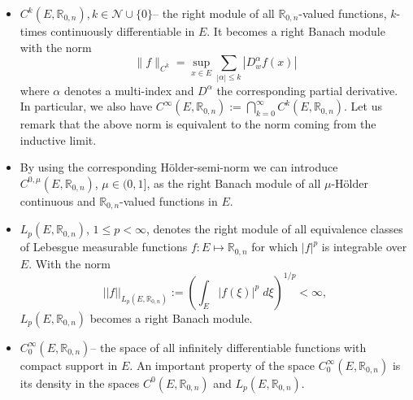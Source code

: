 \documentclass[12pt]{amsart}
\theoremstyle{definition}
\newcommand{\R}{\mathbb{R}}
\newcommand{\Cl}{\R_{0,n}}
\begin{document}
\begin{itemize}
	\item $C^k(E,\Cl), k\in\mathcal{N}\cup\{0\}$-- the right module of all $\Cl$-valued functions, $k$-times continuously differentiable in $E$. It becomes a right Banach module with the norm
	$$
	\|f\|_{C^k}=\sup_{x\in E}\sum_{|\alpha|\leq k}|D^\alpha_w f(x)|
	$$
where $\alpha$ denotes a multi-index and $D^\alpha$ the corresponding partial derivative. In particular, we also have $C^\infty(E,\Cl):=\bigcap_{k=0}^\infty C^k(E,\Cl)$. Let us remark that the above norm is equivalent to the norm coming from the inductive limit.

\item By using the corresponding H\"older-semi-norm we can introduce $C^{0,\mu}(E, \Cl)$, $\mu\in(0,1]$, as the right Banach module of all $\mu$-H\"older continuous and $\Cl$-valued functions in $E$. 
\item $L_p(E,\Cl)$, $1\leq p<\infty$, denotes the right module of all equivalence classes of Lebesgue measurable functions $f:E\mapsto\Cl$ for which $|f|^p$ is integrable over $E$.  With the norm
  \[||f||_{L_p(E,\Cl)}:=\left(\int_E |f(\xi)|^p\;d\xi\right)^{1/p}<\infty,
\]
$L_p(E,\Cl)$ becomes a right Banach module.
\item $C^\infty_0(E,\Cl)$-- the space of all infinitely differentiable functions with compact support in $E$. An important property of the space $C^\infty_0(E,\Cl)$ is its density in the spaces $C^0(E,\Cl)$ and $L_p(E,\Cl)$.
\end{itemize}
\end{document}
